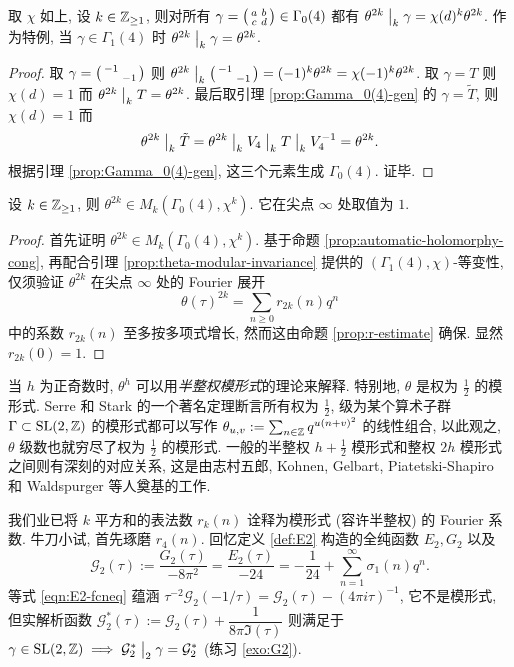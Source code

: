 \begin{lemma}\label{prop:theta-modular-invariance}
	取 $\chi$ 如上, 设 $k \in \mathbb{Z}_{\geq 1}$, 则对所有 $\gamma = \bigl(\begin{smallmatrix} a & b \\ c & d \end{smallmatrix}\bigr) \in \Gamma_0(4)$ 都有 $\theta^{2k} \;\big|_{k} \; \gamma = \chi(d)^k \theta^{2k}$. 作为特例, 当 $\gamma \in \Gamma_1(4)$ 时 $\theta^{2k} \;\big|_{k} \; \gamma = \theta^{2k}$.
\end{lemma}
\begin{proof}
	取 $\gamma = \bigl(\begin{smallmatrix} -1 &  \\  & -1 \end{smallmatrix}\bigr)$ 则 $\theta^{2k} \;\big|_{k} \; \bigl(\begin{smallmatrix} -1 &  \\  & -1 \end{smallmatrix}\bigr) = (-1)^k \theta^{2k} = \chi(-1)^k \theta^{2k}$. 取 $\gamma = T$ 则 $\chi(d)=1$ 而 $\theta^{2k} \;\big|_{k} \; T = \theta^{2k}$. 最后取引理 \ref{prop:Gamma_0(4)-gen} 的 $\gamma = \tilde{T}$, 则 $\chi(d) = 1$ 而
	\[ \theta^{2k} \;\big|_{k} \; \tilde{T} = \theta^{2k} \;\big|_{k} \; V_4 \;\big|_{k} \; T \;\big|_{k} \; V_4^{-1} = \theta^{2k}. \]
	根据引理 \ref{prop:Gamma_0(4)-gen}, 这三个元素生成 $\Gamma_0(4)$. 证毕.
\end{proof}

\begin{proposition}
	设 $k \in \mathbb{Z}_{\geq 1}$, 则 $\theta^{2k} \in M_k\left( \Gamma_0(4), \chi^k \right)$. 它在尖点 $\infty$ 处取值为 $1$.
\end{proposition}
\begin{proof}
	首先证明 $\theta^{2k} \in M_k(\Gamma_0(4), \chi^k)$. 基于命题 \ref{prop:automatic-holomorphy-cong}, 再配合引理 \ref{prop:theta-modular-invariance} 提供的 $(\Gamma_1(4), \chi)$-等变性, 仅须验证 $\theta^{2k}$ 在尖点 $\infty$ 处的 Fourier 展开
	\[ \theta(\tau)^{2k} = \sum_{n \geq 0} r_{2k}(n) q^n \]
	中的系数 $r_{2k}(n)$ 至多按多项式增长, 然而这由命题 \ref{prop:r-estimate} 确保. 显然 $r_{2k}(0) = 1$.
\end{proof}

当 $h$ 为正奇数时, $\theta^h$ 可以用\emph{半整权模形式}的理论来解释. 特别地, $\theta$ 是权为 $\frac{1}{2}$ 的模形式. Serre 和 Stark 的一个著名定理断言所有权为 $\frac{1}{2}$, 级为某个算术子群 $\Gamma \subset \operatorname{SL}(2,\mathbb{Z})$ 的模形式都可以写作 $\theta_{u,v} := \sum_{n \in \mathbb{Z}} q^{u(n+v)^2}$ 的线性组合, 以此观之, $\theta$ 级数也就穷尽了权为 $\frac{1}{2}$ 的模形式. 一般的半整权 $h + \frac{1}{2}$ 模形式和整权 $2h$ 模形式之间则有深刻的对应关系, 这是由志村五郎, Kohnen, Gelbart, Piatetski-Shapiro 和 Waldspurger 等人奠基的工作. 

我们业已将 $k$ 平方和的表法数 $r_k(n)$ 诠释为模形式 (容许半整权) 的 Fourier 系数. 牛刀小试, 首先琢磨 $r_4(n)$. 回忆定义 \ref{def:E2} 构造的全纯函数 $E_2, G_2$ 以及
\[ \mathcal{G}_2(\tau) := \dfrac{G_2(\tau)}{-8\pi^2} = \dfrac{E_2(\tau)}{-24} = -\dfrac{1}{24} + \sum_{n=1}^\infty  \sigma_1(n) q^n. \]
等式 \eqref{eqn:E2-fcneq} 蕴涵 $\tau^{-2} \mathcal{G}_2(-1/\tau) = \mathcal{G}_2(\tau) - (4\pi i\tau)^{-1}$, 它不是模形式, 但实解析函数 $\mathcal{G}^*_2(\tau) := \mathcal{G}_2(\tau) + \dfrac{1}{8\pi\Im(\tau)}$ 则满足于 $\gamma \in \operatorname{SL}(2,\mathbb{Z}) \implies \mathcal{G}^*_2 \;\big|_{2} \; \gamma = \mathcal{G}^*_2$ (练习 \ref{exo:G2}).

